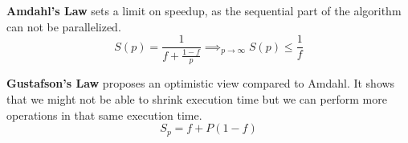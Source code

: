 \begin{theorem}
\textbf{Amdahl's Law } sets a limit on speedup, as the sequential part of the algorithm can not be parallelized.
$$S(p) = \frac{1}{f + \frac{1-f}{p}} \implies_{p \to \infty} S(p) \leq \frac{1}{f}$$
\end{theorem}


\begin{theorem}
\textbf{Gustafson's Law } proposes an optimistic view compared to Amdahl. It shows that we might not be able to shrink execution time but we can perform more operations in that same execution time.
$$S_p = f + P(1 - f)$$
\end{theorem}

